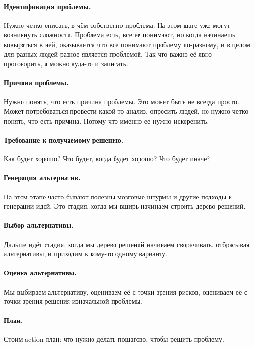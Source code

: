 \documentclass{../../text-style}
\begin{document}
\paragraph*{Идентификация проблемы.} Нужно четко описать, в чём собственно проблема. На этом шаге уже могут возникнуть сложности. Проблема есть, все ее понимают, но когда начинаешь ковыряться в ней, оказывается что все понимают проблему по-разному, и в целом для разных людей разное является проблемой. Так что важно её явно проговорить, а можно куда-то и записать.

\paragraph*{Причина проблемы.} Нужно понять, что есть причина проблемы. Это может быть не всегда просто. Может потребоваться провести какой-то анализ, опросить людей, но нужно четко понять, что есть причина. Потому что именно ее нужно искоренить.

\paragraph*{Требование к получаемому решению.} Как будет хорошо? Что будет, когда будет хорошо? Что будет иначе?

\paragraph*{Генерация альтернатив.} На этом этапе часто бывают полезны мозговые штурмы и другие подходы к генерации идей. Это стадия, когда мы вширь начинаем строить дерево решений. 

\paragraph*{Выбор альтернативы.} Дальше идёт стадия, когда мы дерево решений начинаем сворачивать, отбрасывая альтернативы, и приходим к кому-то одному варианту.

\paragraph*{Оценка альтернативы.} Мы выбираем альтернативу, оцениваем её с точки зрения рисков, оцениваем её с точки зрения решения изначальной проблемы.

\paragraph*{План.} Стоим action-план: что нужно делать пошагово, чтобы решить проблему.
\end{document}
